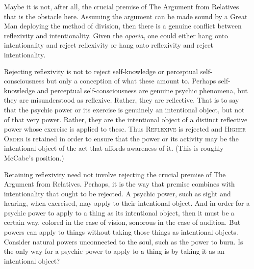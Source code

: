 
Maybe it is not, after all, the crucial premise of The Argument from Relatives that is the obstacle here. Assuming the argument can be made sound by a Great Man deploying the method of division, then there is a genuine conflict between reflexivity and intentionality. Given the \emph{aporia}, one could either hang onto intentionality and reject reflexivity or hang onto reflexivity and reject intentionality.

Rejecting reflexivity is not to reject self-knowledge or perceptual self-conscious\-ness but only a conception of what these amount to. Perhaps self-knowledge and perceptual self-consciousness are genuine psychic phenomena, but they are misunderstood as reflexive. Rather, they are reflective. That is to say that the psychic power or its exercise is genuinely an intentional object, but not of that very power. Rather, they are the intentional object of a distinct reflective power whose exercise is applied to these. Thus \textsc{Reflexive} is rejected and \textsc{Higher Order} is retained in order to ensure that the power or its activity may be the intentional object of the act that affords awareness of it. (This is roughly McCabe's \citeyear{McCabe:2007ss} position.)

Retaining reflexivity need not involve rejecting the crucial premise of The Argument from Relatives. Perhaps, it is the way that premise combines with intentionality that ought to be rejected. A psychic power, such as sight and hearing, when exercised, may apply to their intentional object. And in order for a psychic power to apply to a thing as its intentional object, then it must be a certain way, colored in the case of vision, sonorous in the case of audition. But powers can apply to things without taking those things as intentional objects. Consider natural powers unconnected to the soul, such as the power to burn. Is the only way for a psychic power to apply to a thing is by taking it as an intentional object?

